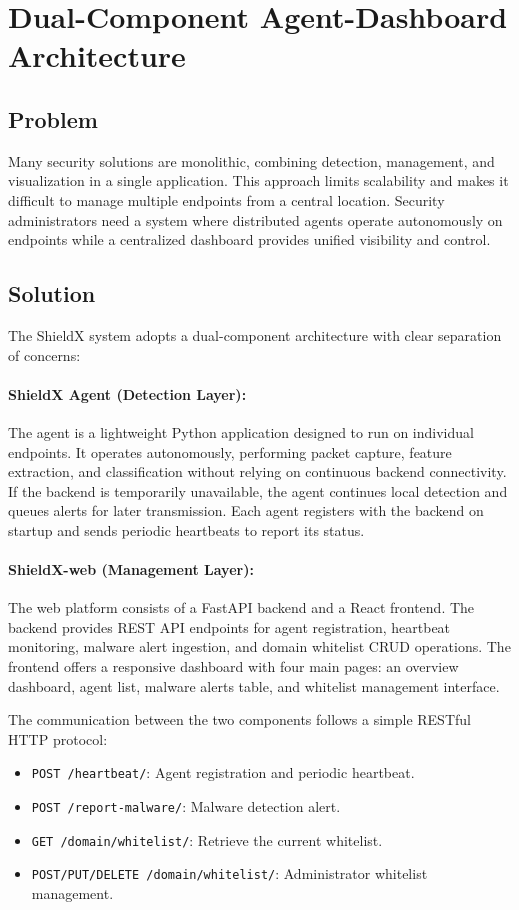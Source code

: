 \documentclass[../Main.tex]{subfiles}
\begin{document}
\section{Dual-Component Agent-Dashboard Architecture}

\subsection{Problem}

Many security solutions are monolithic, combining detection, management, and visualization in a single application. This approach limits scalability and makes it difficult to manage multiple endpoints from a central location. Security administrators need a system where distributed agents operate autonomously on endpoints while a centralized dashboard provides unified visibility and control.

\subsection{Solution}

The ShieldX system adopts a dual-component architecture with clear separation of concerns:

\paragraph{ShieldX Agent (Detection Layer):} The agent is a lightweight Python application designed to run on individual endpoints. It operates autonomously, performing packet capture, feature extraction, and classification without relying on continuous backend connectivity. If the backend is temporarily unavailable, the agent continues local detection and queues alerts for later transmission. Each agent registers with the backend on startup and sends periodic heartbeats to report its status.

\paragraph{ShieldX-web (Management Layer):} The web platform consists of a FastAPI backend and a React frontend. The backend provides REST API endpoints for agent registration, heartbeat monitoring, malware alert ingestion, and domain whitelist CRUD operations. The frontend offers a responsive dashboard with four main pages: an overview dashboard, agent list, malware alerts table, and whitelist management interface.

The communication between the two components follows a simple RESTful HTTP protocol:
\begin{itemize}
    \item \texttt{POST /heartbeat/}: Agent registration and periodic heartbeat.
    \item \texttt{POST /report-malware/}: Malware detection alert.
    \item \texttt{GET /domain/whitelist/}: Retrieve the current whitelist.
    \item \texttt{POST/PUT/DELETE /domain/whitelist/}: Administrator whitelist management.
\end{itemize}
\end{document}
